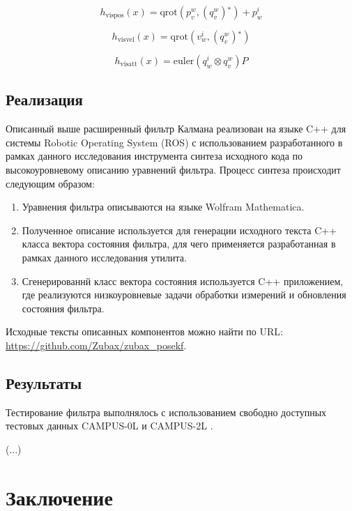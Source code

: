 \documentclass[12pt,a4paper]{article}
\begin{document}
\begin{equation}
    h_{\text{vispos}}(x)=\text{qrot}\left(p_v^w,\left(q_v^w\right){}^*\right)+p_w^i
\end{equation}

\begin{equation}
    h_{\text{visvel}}(x)=\text{qrot}\left(v_w^i,\left(q_v^w\right){}^*\right)
\end{equation}

\begin{equation}
    h_{\text{visatt}}(x)=\text{euler}\left(q_w^i\otimes q_v^w\right)P
\end{equation}

\subsection{Реализация}

Описанный выше расширенный фильтр Калмана реализован на языке C++ для системы Robotic Operating System (ROS) \cite{ROS} с использованием разработанного в рамках данного исследования инструмента синтеза исходного кода по высокоуровневому описанию уравнений фильтра. Процесс синтеза происходит следующим образом:

\begin{enumerate}
    \item Уравнения фильтра описываются на языке Wolfram Mathematica.
    \item Полученное описание используется для генерации исходного текста C++ класса вектора состояния фильтра, для чего применяется разработанная в рамках данного исследования утилита.
    \item Сгенерированнй класс вектора состояния используется C++ приложением, где реализуются низкоуровневые задачи обработки измерений и обновления состояния фильтра.
\end{enumerate}

Исходные тексты описанных компонентов можно найти по URL: \url{https://github.com/Zubax/zubax_posekf}.

\subsection{Результаты}

Тестирование фильтра выполнялось с использованием свободно доступных тестовых данных CAMPUS-0L и CAMPUS-2L \cite{blanco2009cor}.

(...)

\section{Заключение}



\nocite{*}
\newpage
\begin{fullwidth}
\printbibliography
\end{fullwidth}
\end{document}
